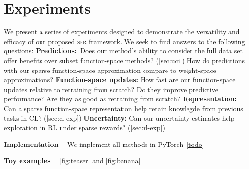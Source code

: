 \documentclass{article}
\renewcommand{\paragraph}[1]{{\bf #1}~~}
\newcommand{\our}{\textsc{sfr}\xspace}
\begin{document}
\section{Experiments}
\label{sec:experiments}
%
We present a series of experiments designed to demonstrate the versatility and efficacy of our proposed \our framework. We seek to find answers to the following questions: 
\textbf{Predictions:}~Does our method's ability to consider the full data set offer benefits over subset function-space methods? (\cref{sec:uci}) How do predictions with our sparse function-space approximation compare to weight-space approximations? 
\textbf{Function-space updates:} How fast are our function-space updates relative to retraining from scratch? Do they improve predictive performance? Are they as good as retraining from scratch? 
\textbf{Representation:} Can a sparse function-space representation help retain knowlegde from previous tasks in CL? (\cref{sec:cl-exp})
\textbf{Uncertainty:} Can our uncertainty estimates help exploration in RL under sparse rewards? (\cref{sec:rl-exp})



\paragraph{Implementation} We implement all methods in PyTorch~\ref{todo} 


\paragraph{Toy examples} \cref{fig:teaser} and \cref{fig:banana}


\end{document}
